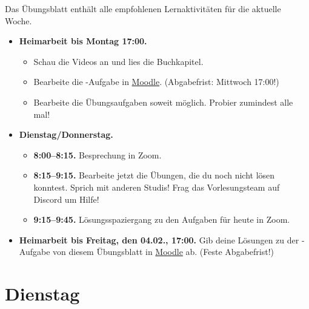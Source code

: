 \documentclass{uebung_cs}
\begin{document}
Das Übungsblatt enthält alle empfohlenen Lernaktivitäten für die aktuelle Woche.

\begin{itemize}
\item \textbf{Heimarbeit bis Montag 17:00.}
    \begin{itemize}
    \item 
    Schau die Videos an und lies die Buchkapitel.
    \item Bearbeite die -Aufgabe in \href{https://moodle.studiumdigitale.uni-frankfurt.de/moodle/course/view.php?id=2241}{Moodle}. (Abgabefrist: Mittwoch 17:00!)
    \item Bearbeite die Übungsaufgaben soweit möglich. Probier zumindest alle mal!
    \end{itemize}
\item \textbf{Dienstag/Donnerstag.}
\begin{itemize}
    \item \textbf{8:00--8:15.} Besprechung in Zoom.
    \item \textbf{8:15--9:15.} Bearbeite jetzt die Übungen, die du noch nicht lösen konntest. Sprich mit anderen Studis! Frag das Vorlesungsteam auf Discord um Hilfe!
    \item \textbf{9:15--9:45.} Lösungsspaziergang zu den Aufgaben für heute in Zoom.
\end{itemize}

\item \textbf{Heimarbeit bis Freitag, den 04.02., 17:00.} Gib deine Lösungen zu der -Aufgabe von diesem Übungsblatt in \href{https://moodle.studiumdigitale.uni-frankfurt.de/moodle/course/view.php?id=2241}{Moodle} ab. (Feste Abgabefrist!)
\end{itemize}

\section*{Dienstag}
\end{document}
